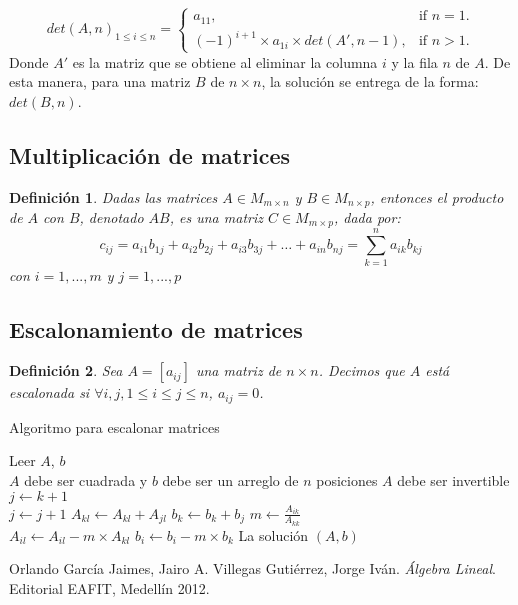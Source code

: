 \documentclass[12pt]{article}
\newtheorem{definition}{Definición}[section]
\begin{document}
	\begin{equation}
	det(A, n)_{1\leq i \leq n}=\begin{cases}
	a_{11}, & \text{if $n = 1$}.\\
	(-1)^{i+1} \times a_{1i} \times det(A', n - 1) , & \text{if $n > 1$}.
	\end{cases}
	\end{equation}
	Donde $A'$ es la matriz que se obtiene al eliminar la columna $i$ y la fila $n$ de $A$. De esta manera, para una matriz $B$ de $n \times n$, la solución se entrega de la forma:
	$det(B, n)$.
	
	\subsection{Multiplicación de matrices}
	\begin{definition}
		Dadas las matrices $A \in M_{m\times n}$ y $B \in M_{n\times p}$, entonces el producto de $A$ con $B$, denotado $AB$, es una matriz $C \in M_{m\times p}$, dada por: \cite{algebralineal}
		\[
			c_{ij} = a_{i1}b_{1j} + a_{i2}b_{2j} + a_{i3}b_{3j} + \dots + a_{in}b_{nj} = \sum_{k = 1}^{n}{a_{ik}b_{kj}}		
		\]
		con $i = 1, ..., m$ y $j = 1, ..., p$
	\end{definition}
	\subsection{Escalonamiento de matrices}
	\begin{definition}
		Sea $A = [a_{ij}]$ una matriz de $n \times n$. Decimos que $A$ está escalonada si $\forall{i,j}, 1\leq i \leq j \leq n$, $a_{ij} = 0$.
	\end{definition}
	\begin{algorithm}[H]
		\caption{Algoritmo para escalonar matrices}
		Leer $A$, $b$ \\
		{$A$ debe ser cuadrada y $b$ debe ser un arreglo de $n$ posiciones}
		{$A$ debe ser invertible}
		\Else
		{
			{
				{
					$j \leftarrow k + 1$\\
					{
						$j \leftarrow j + 1$
					}
					{
						{
							$A_{kl} \leftarrow A_{kl} + A_{jl}$
						}
						$b_k \leftarrow b_k + b_j$
					}
				}
				{
					{
						$m \leftarrow \frac{A_{ik}}{A_{kk}}$\\
						{
							$A_{il} \leftarrow A_{il} - m\times A_{kl}$
						}
						$b_i \leftarrow b_i - m \times b_k$
					}
				}
			}
		}
		La solución $(A, b)$
	\end{algorithm}
	\begin{thebibliography}{9}
		Orlando García Jaimes, Jairo A. Villegas Gutiérrez, Jorge Iván. \textit{Álgebra Lineal}. Editorial EAFIT, Medellín 2012. 
		
	\end{thebibliography}
\end{document}
